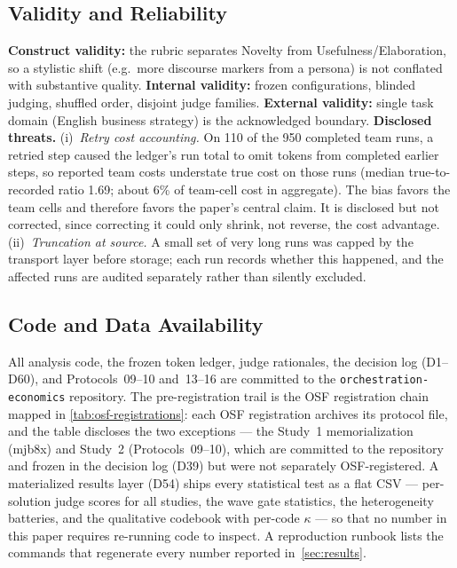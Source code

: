 \documentclass[12pt,a4paper]{article}
\begin{document}
\subsection{Validity and Reliability}

\textbf{Construct validity:} the rubric separates Novelty from
Usefulness/Elaboration, so a stylistic shift (e.g.\ more discourse markers from
a persona) is not conflated with substantive quality. \textbf{Internal validity:}
frozen configurations, blinded judging, shuffled order, disjoint judge families.
\textbf{External validity:} single task domain (English business strategy) is
the acknowledged boundary. \textbf{Disclosed threats.} (i)~\emph{Retry cost accounting.} On 110 of the 950
completed team runs, a retried step caused the ledger's run total to omit
tokens from completed earlier steps, so reported team costs understate true
cost on those runs (median true-to-recorded ratio 1.69; about 6\% of team-cell
cost in aggregate). The bias favors the team cells and therefore favors the
paper's central claim. It is disclosed but not corrected, since correcting it
could only shrink, not reverse, the cost advantage. (ii)~\emph{Truncation at source.} A small set of
very long runs was capped by the transport layer before storage; each run
records whether this happened, and the affected runs are audited separately
rather than silently excluded.

\subsection{Code and Data Availability}
All analysis code, the frozen token ledger, judge rationales, the decision log
(D1--D60), and Protocols~09--10 and~13--16 are committed to the
\texttt{orchestration-economics} repository. The pre-registration trail is the
OSF registration chain mapped in \cref{tab:osf-registrations}: each OSF
registration archives its protocol file, and the table discloses the two
exceptions --- the Study~1 memorialization (mjb8x) and Study~2
(Protocols~09--10), which are committed to the repository and frozen in the
decision log (D39) but were not separately OSF-registered.
A materialized results layer (D54) ships every statistical test as a flat CSV
--- per-solution judge scores for all studies, the wave gate statistics, the
heterogeneity batteries, and the qualitative codebook with per-code $\kappa$
--- so that no number in this paper requires re-running code to inspect.
A reproduction runbook
\citep{SandveEtAl2013} lists the commands that regenerate every number reported
in~\cref{sec:results}.
\end{document}
